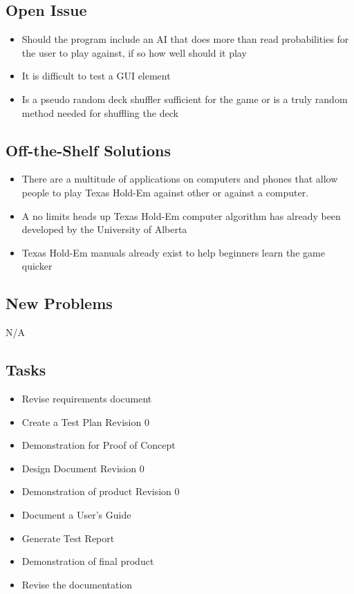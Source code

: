 \documentclass[12pt]{article}
\begin{document}
	\subsection{Open Issue}
	\begin{itemize}
	\item	Should the program include an AI that does more than read probabilities for the 			user to play against, if so how well should it play
	\item	It is difficult to test a GUI element
	\item	Is a pseudo random deck shuffler sufficient for the game or is a truly random 				method needed for shuffling the deck
	\end{itemize}
	\subsection{Off-the-Shelf Solutions}
	\begin{itemize}
	\item	There are a multitude of applications on computers and phones that allow people 			to play Texas Hold-Em against other or against a computer. 
	\item	A no limits heads up Texas Hold-Em computer algorithm has already been developed 			by the University of Alberta
	\item	Texas Hold-Em manuals already exist to help beginners learn the game quicker
	\end{itemize}
	\subsection{New Problems}
	N/A
	\subsection{Tasks}
	\begin{itemize}	
	\item 	Revise requirements document
	\item 	Create a Test Plan Revision 0 
	\item 	Demonstration for Proof of Concept
	\item 	Design Document Revision 0
	\item 	Demonstration of product Revision 0
	\item 	Document a User’s Guide 
	\item 	Generate Test Report 
	\item 	Demonstration of final product
	\item 	Revise the documentation
	\end{itemize}
\end{document}
